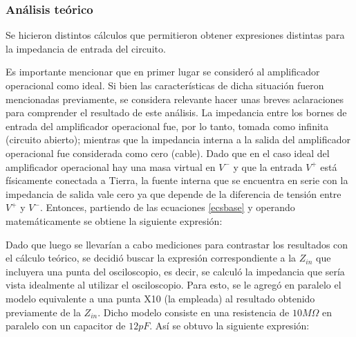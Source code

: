 \subsubsection*{An\'alisis te\'orico} %
Se hicieron distintos c\'alculos que permitieron obtener expresiones distintas para la impedancia de entrada del circuito.

Es importante mencionar que en primer lugar se consider\'o al amplificador operacional como ideal. Si bien las caracter\'isticas de dicha situaci\'on fueron mencionadas previamente, se considera relevante hacer unas breves aclaraciones para comprender el resultado de este an\'alisis. La impedancia entre los bornes de entrada del amplificador operacional fue, por lo tanto, tomada como infinita (circuito abierto); mientras que la impedancia interna a la salida del amplificador operacional fue considerada como cero (cable). Dado que en el caso ideal del amplificador operacional hay una masa virtual en $V^-$ y que la entrada $V^+$ est\'a f\'isicamente conectada a Tierra, la fuente interna que se encuentra en serie con la impedancia de salida vale cero ya que depende de la diferencia de tensi\'on entre $V^+$ y $V^-$. Entonces, partiendo de las ecuaciones \ref{ecsbase} y operando matem\'aticamente se obtiene la siguiente expresi\'on:

Dado que luego se llevar\'ian a cabo mediciones para contrastar los resultados con el c\'alculo te\'orico, se decidi\'o buscar la expresi\'on correspondiente a la $Z_{in}$ que incluyera una punta del osciloscopio, es decir, se calcul\'o la impedancia que ser\'ia vista idealmente al utilizar el osciloscopio. Para esto, se le agreg\'o en paralelo el modelo equivalente a una punta X10 (la empleada) al resultado obtenido previamente de la $Z_{in}$. Dicho modelo consiste en una resistencia de $10M\Omega$ en paralelo con un capacitor de $12pF$. As\'i se obtuvo la siguiente expresi\'on:

